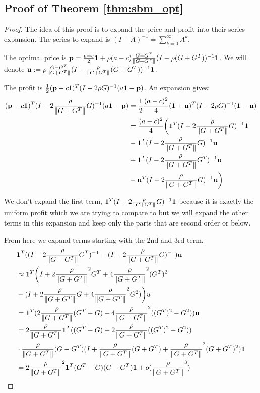 \subsection{Proof of Theorem \ref{thm:sbm_opt}}
\begin{proof}
    The idea of this proof is to expand the price and profit into their series expansion. The series to expand is $(I - A)^{-1} = \sum_{k=0}^\infty A^k$. 

    The optimal price is $\mathbf{p} = \frac{a+c}{2} \mathbf{1} + \rho (a-c) \frac{G-G^T}{\|G+G^T\|} (I - \rho(G+G^T))^{-1} \mathbf{1} $. We will denote $\mathbf{u} := \rho \frac{G-G^T}{\|G+G^T\|} (I - \frac{\rho}{\|G+G^T\|}(G+G^T))^{-1} \mathbf{1}$.

    The profit is $\frac{1}{2} (\mathbf{p} - c1)^T (I - 2\rho G)^{-1} (a\mathbf{1} - \mathbf{p})$. An expansion gives:
    \begin{align*}
        (\mathbf{p} - c\mathbf{1})^T (I - 2\frac{\rho}{\|G+G^T\|} G)^{-1} (a\mathbf{1} - \mathbf{p}) &= \frac{1}{2} \frac{(a-c)^2}{4} (\mathbf{1} + \mathbf{u})^T (I - 2\rho G)^{-1} (\mathbf{1} - \mathbf{u}) \\ 
        &= \frac{(a-c)^2}{4}\biggl( \mathbf{1}^T  (I - 2\frac{\rho}{\|G+G^T\|} G)^{-1} \mathbf{1} \\
        &- \mathbf{1}^T (I - 2\frac{\rho}{\|G+G^T\|} G)^{-1} \mathbf{u}\\
        &+ \mathbf{1}^T (I - 2\frac{\rho}{\|G+G^T\|} G^T)^{-1} \mathbf{u}\\
        &- \mathbf{u}^T (I -2 \frac{\rho}{\|G+G^T\|} G)^{-1} \mathbf{u} \biggr) \\ 
    \end{align*}

    We don't expand the first term, $\mathbf{1}^T (I - 2\frac{\rho}{\|G+G^T\|} G)^{-1} \mathbf{1} $ because it is exactly the uniform profit which we are trying to compare to but we will expand the other terms in this expansion and keep only the parts that are second order or below. 

    From here we expand terms starting with the 2nd and 3rd term. 
    \begin{align*}
        &\mathbf{1}^T  ((I - 2\frac{\rho}{\|G+G^T\|} G^T)^{-1} - (I - 2\frac{\rho}{\|G+G^T\|} G)^{-1}) \mathbf{u}  \\
        &\approx \mathbf{1}^T \biggl( I + 2\frac{\rho}{\|G+G^T\|}^2 G^T + 4\frac{\rho}{\|G+G^T\|}^2 (G^T)^2 \\
        &- (I + 2\frac{\rho}{\|G+G^T\|} G + 4\frac{\rho}{\|G+G^T\|}^2 G^2) \biggr) u \\
        &= \mathbf{1}^T (2\frac{\rho}{\|G+G^T\|} (G^T - G) + 4\frac{\rho}{\|G+G^T\|}^2 ((G^T)^2 - G^2) ) \mathbf{u} \\
        &= 2\frac{\rho}{\|G+G^T\|} \mathbf{1}^T ( (G^T-G) + 2\frac{\rho}{\|G+G^T\|}((G^T)^2 - G^2) ) \\
        &\cdot \frac{\rho}{\|G+G^T\|} (G -G^T) (I + \frac{\rho}{\|G+G^T\|} (G+G^T) + \frac{\rho}{\|G+G^T\|}^2 (G+G^T)^2 ) \mathbf{1} \\
        &= 2 \frac{\rho}{\|G+G^T\|}^2 \mathbf{1}^T (G^T-G) (G-G^T) \mathbf{1} + o(\frac{\rho}{\|G+G^T\|}^3)
    \end{align*}


\end{proof}
